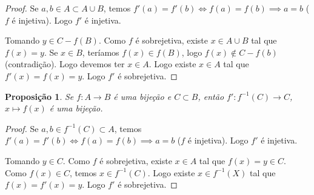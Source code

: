 \documentclass{article}
\theoremstyle{plain}
\newtheorem{prop}{Proposição}[section]
\theoremstyle{definition}
\theoremstyle{remark}
\begin{document}
\begin{proof}
	Se $a,b \in A\subset A\cup B$, temos $f'(a) = f'(b) \iff f(a) = f(b) \implies a = b$ ($f$ é injetiva). Logo $f'$ é injetiva.

	Tomando $y \in C-f(B)$. Como $f$ é sobrejetiva, existe $x\in A\cup B$ tal que $f(x) = y$. Se $x\in B$, teríamos $f(x) \in f(B)$, logo $f(x) \not \in C-f(b)$ (contradição). Logo devemos ter $x\in A$. Logo existe $x\in A$ tal que $f'(x) = f(x) = y$. Logo $f'$ é sobrejetiva. 
\end{proof}
\begin{prop}
	Se $f: A \to B$ é uma bijeção e $C \subset B$, então $f': f^{-1}(C) \to C$, $x\mapsto f(x)$ é uma bijeção.
\end{prop}
\begin{proof}
	Se $a,b \in f^{-1}(C) \subset A$, temos $f'(a) = f'(b) \iff f(a) = f(b) \implies a = b$ ($f$ é injetiva). Logo $f'$ é injetiva.

	Tomando $y \in C$. Como $f$ é sobrejetiva, existe $x\in A$ tal que $f(x) = y\in C$. Como $f(x)\in C$, temos $x \in f^{-1}(C)$. Logo existe $x\in f^{-1}(X)$ tal que $f(x) = f'(x) =  y$. Logo $f'$ é sobrejetiva.   
\end{proof}
\end{document}
